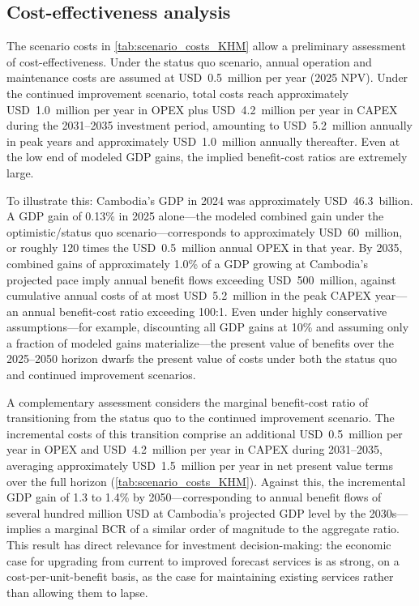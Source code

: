 \documentclass[
  final,
  10pt,
  letterpaper,
  english,
]{article}
\begin{document}
\subsection{Cost-effectiveness analysis}
\label{sec:discussion_cost_effectiveness}

The scenario costs in \cref{tab:scenario_costs_KHM} allow a preliminary assessment of
cost-effectiveness. Under the status quo scenario, annual operation and
maintenance costs are assumed at USD~0.5~million per year (2025 NPV). Under the
continued improvement scenario, total costs reach approximately USD~1.0~million
per year in OPEX plus USD~4.2~million per year in CAPEX during the 2031--2035
investment period, amounting to USD~5.2~million annually in peak years and
approximately USD~1.0~million annually thereafter. Even at the low end of
modeled GDP gains, the implied benefit-cost ratios are extremely large.

To illustrate this: Cambodia's GDP in 2024 was approximately USD~46.3~billion. A
GDP gain of 0.13\% in 2025 alone---the modeled combined gain under the
optimistic/status quo scenario---corresponds to approximately USD~60~million, or
roughly 120 times the USD~0.5~million annual OPEX in that year. By 2035,
combined gains of approximately 1.0\% of a GDP growing at Cambodia's projected
pace imply annual benefit flows exceeding USD~500~million, against cumulative
annual costs of at most USD~5.2~million in the peak CAPEX year---an annual
benefit-cost ratio exceeding 100:1. Even under highly conservative
assumptions---for example, discounting all GDP gains at 10\% and assuming only a
fraction of modeled gains materialize---the present value of benefits over the
2025--2050 horizon dwarfs the present value of costs under both the status quo
and continued improvement scenarios. 

A complementary assessment considers the marginal benefit-cost ratio of
transitioning from the status quo to the continued improvement scenario. The
incremental costs of this transition comprise an additional USD~0.5~million per
year in OPEX and USD~4.2~million per year in CAPEX during 2031--2035, averaging
approximately USD~1.5~million per year in net present value terms over the full
horizon (\cref{tab:scenario_costs_KHM}). Against this, the incremental GDP gain of 1.3 to 1.4\% by
2050---corresponding to annual benefit flows of several hundred million USD at
Cambodia's projected GDP level by the 2030s---implies a marginal BCR of a similar
order of magnitude to the aggregate ratio. This result has direct relevance for
investment decision-making: the economic case for upgrading from current to
improved forecast services is as strong, on a cost-per-unit-benefit basis, as
the case for maintaining existing services rather than allowing them to lapse.
\end{document}
